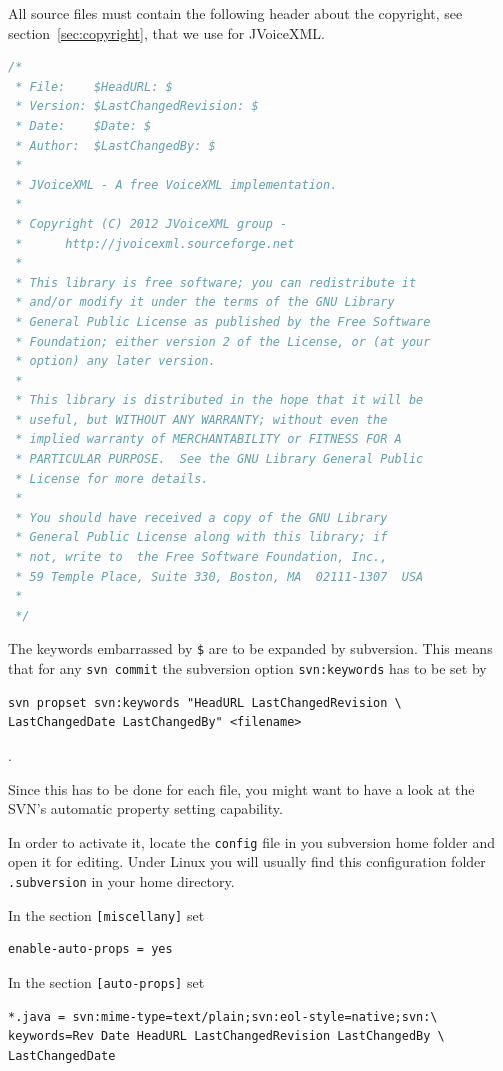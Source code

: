 \documentclass[11pt,a4paper]{article}
\begin{document}
All source files must contain the following header about the 
copyright, see section~\ref{sec:copyright}, that we use for JVoiceXML.

\begin{lstlisting}[language=Java]
/*
 * File:    $HeadURL: $
 * Version: $LastChangedRevision: $
 * Date:    $Date: $
 * Author:  $LastChangedBy: $
 *
 * JVoiceXML - A free VoiceXML implementation.
 *
 * Copyright (C) 2012 JVoiceXML group - 
 *      http://jvoicexml.sourceforge.net
 *
 * This library is free software; you can redistribute it 
 * and/or modify it under the terms of the GNU Library 
 * General Public License as published by the Free Software 
 * Foundation; either version 2 of the License, or (at your 
 * option) any later version.
 *
 * This library is distributed in the hope that it will be 
 * useful, but WITHOUT ANY WARRANTY; without even the 
 * implied warranty of MERCHANTABILITY or FITNESS FOR A 
 * PARTICULAR PURPOSE.  See the GNU Library General Public 
 * License for more details.
 *
 * You should have received a copy of the GNU Library 
 * General Public License along with this library; if 
 * not, write to  the Free Software Foundation, Inc., 
 * 59 Temple Place, Suite 330, Boston, MA  02111-1307  USA
 *
 */
\end{lstlisting}

The keywords embarrassed by \texttt{\$} are to be expanded by 
subversion. 
This means that for any \texttt{svn commit} the subversion
option \texttt{svn:keywords} has to be set by

\begin{lstlisting}
svn propset svn:keywords "HeadURL LastChangedRevision \
LastChangedDate LastChangedBy" <filename>
\end{lstlisting}.

Since this has to be done for each file, you might want to have a look
at the SVN's automatic property setting capability.

In order to activate it, locate the \texttt{config} file in you subversion home
folder and open it for editing. Under Linux you will usually find this
configuration folder \texttt{.subversion} in your home directory.

In the section \texttt{[miscellany]} set
\begin{lstlisting}
enable-auto-props = yes
\end{lstlisting}

In the section \texttt{[auto-props]} set
\begin{lstlisting}
*.java = svn:mime-type=text/plain;svn:eol-style=native;svn:\
keywords=Rev Date HeadURL LastChangedRevision LastChangedBy \
LastChangedDate
\end{lstlisting}
\end{document}
